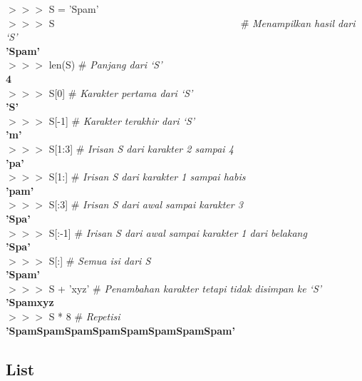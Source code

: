 \begin{IDLE}
\begin{tabbing}
$>>>$ S = 'Spam' \\
$>>>$ S ~~~~~~~~~~~~~~~~~~~~~~~~~~~~~~~~~~~~ \= \# \textit{Menampilkan hasil dari `S'}\\
\textbf{'Spam'}\\
$>>>$ len(S) \> \# \textit{Panjang dari `S'}\\
\textbf{4}\\
$>>>$ S[0] \> \# \textit{Karakter pertama dari `S'}\\
\textbf{'S'}\\
$>>>$ S[-1] \> \# \textit{Karakter terakhir dari `S'}\\
\textbf{'m'}\\
$>>>$ S[1:3] \> \# \textit{Irisan S dari karakter 2 sampai 4}\\
\textbf{'pa'}\\
$>>>$ S[1:] \> \# \textit{Irisan S dari karakter 1 sampai habis}\\
\textbf{'pam'}\\
$>>>$ S[:3] \> \# \textit{Irisan S dari awal sampai karakter 3}\\
\textbf{'Spa'}\\
$>>>$ S[:-1] \> \# \textit{Irisan S dari awal sampai karakter 1 dari belakang}\\
\textbf{'Spa'}\\
$>>>$ S[:] \> \# \textit{Semua isi dari S}\\
\textbf{'Spam'}\\
$>>>$ S + 'xyz' \> \# \textit{Penambahan karakter tetapi tidak disimpan ke `S'}\\
\textbf{'Spamxyz}\\
$>>>$ S * 8 \> \# \textit{Repetisi}\\
\textbf{'SpamSpamSpamSpamSpamSpamSpamSpam'}
\end{tabbing}
\end{IDLE}

\subsection{List}

